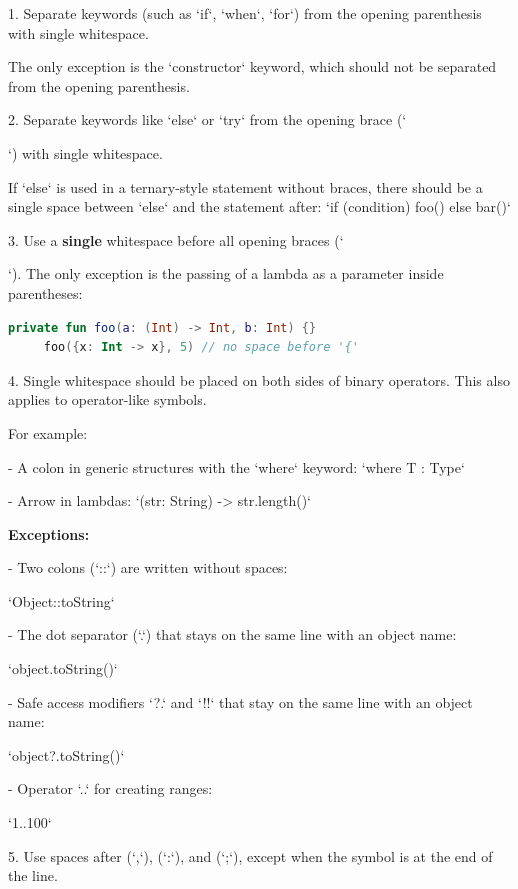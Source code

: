 {{1.  Separate keywords (such as `if`, `when`, `for`) from the opening parenthesis with single whitespace.

    The only exception is the `constructor` keyword, which should not be separated from the opening parenthesis.



2.  Separate keywords like `else` or `try` from the opening brace (`{`) with single whitespace.

    If `else` is used in a ternary-style statement without braces, there should be a single space between `else` and the statement after: `if (condition) foo() else bar()`



3.  Use a \textbf{single} whitespace before all opening braces (`{`). The only exception is the passing of a lambda as a parameter inside parentheses:

\begin{lstlisting}[language=Kotlin]
     private fun foo(a: (Int) -> Int, b: Int) {}
     foo({x: Int -> x}, 5) // no space before '{'
\end{lstlisting}


4.  Single whitespace should be placed on both sides of binary operators. This also applies to operator-like symbols.

    For example: 

    

 - A colon in generic structures with the `where` keyword:  `where T : Type`

 - Arrow in lambdas: `(str: String) -> str.length()`



\textbf{Exceptions:}



- Two colons (`::`) are written without spaces:\

  `Object::toString`

- The dot separator (`.`) that stays on the same line with an object name:\

  `object.toString()`

- Safe access modifiers `?.` and `!!` that stay on the same line with an object name:\

  `object?.toString()`

- Operator `..` for creating ranges:\

  `1..100`



5.  Use spaces after (`,`), (`:`), and (`;`), except when the symbol is at the end of the line.

}}}}
